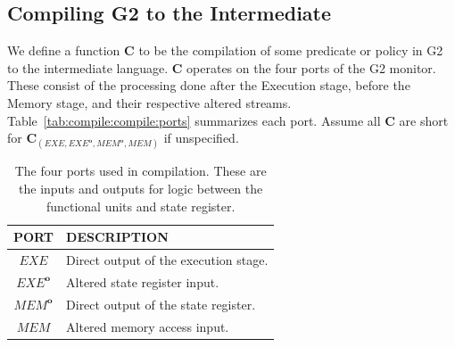 \documentclass[sigconf,usenames,dvipsnames,svgnames,table]{acmart}
\newcommand{\obf}[1]{#1^\mathbf{o}}
\def \sysname {\textsc{G2}\xspace}
\begin{document}
    \subsection{Compiling \sysname to the Intermediate}\label{sec:comp:comp}
      We define a function $\mathbf{C}$ to be the compilation of some predicate or policy in \sysname to the intermediate language.
      $\mathbf{C}$ operates on the four ports of the \sysname monitor.
      These consist of the processing done after the Execution stage, before the Memory stage, and their respective altered streams.
      Table~\ref{tab:compile:compile:ports} summarizes each port.
      Assume all $\mathbf{C}$ are short for $\mathbf{C}_{(EXE,\obf{EXE},\obf{MEM},MEM)}$ if unspecified.
      \begin{table}
        \centering
        \begin{tabular}{c | l}
          PORT        & DESCRIPTION \\ \hline
          $EXE$       & Direct output of the execution stage. \\
          $\obf{EXE}$ & Altered state register input. \\
          $\obf{MEM}$ & Direct output of the state register. \\
          $MEM$       & Altered memory access input. 
        \end{tabular}
        \caption{
          The four ports used in compilation.
          These are the inputs and outputs for logic between the functional units and state register.
        }
        \label{tab:comp:comp:ports}
      \end{table}

\end{document}
